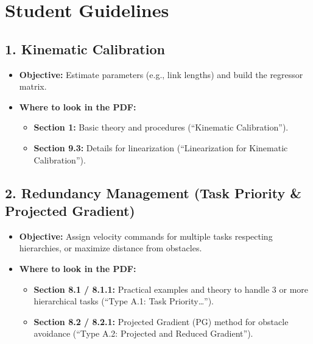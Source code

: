 \documentclass[11pt,a4paper]{article}
\begin{document}
\section*{Student Guidelines}

\subsection*{1. Kinematic Calibration}
\begin{itemize}
    \item \textbf{Objective:} Estimate parameters (e.g., link lengths) and build the regressor matrix.
    \item \textbf{Where to look in the PDF:}
    \begin{itemize}
        \item \textbf{Section 1:} Basic theory and procedures (``Kinematic Calibration'').
        \item \textbf{Section 9.3:} Details for linearization (``Linearization for Kinematic Calibration'').
    \end{itemize}
\end{itemize}

\subsection*{2. Redundancy Management (Task Priority \& Projected Gradient)}
\begin{itemize}
    \item \textbf{Objective:} Assign velocity commands for multiple tasks respecting hierarchies, or maximize distance from obstacles.
    \item \textbf{Where to look in the PDF:}
    \begin{itemize}
        \item \textbf{Section 8.1 / 8.1.1:} Practical examples and theory to handle 3 or more hierarchical tasks (``Type A.1: Task Priority\dots'').
        \item \textbf{Section 8.2 / 8.2.1:} Projected Gradient (PG) method for obstacle avoidance (``Type A.2: Projected and Reduced Gradient'').
    \end{itemize}
\end{itemize}
\end{document}
